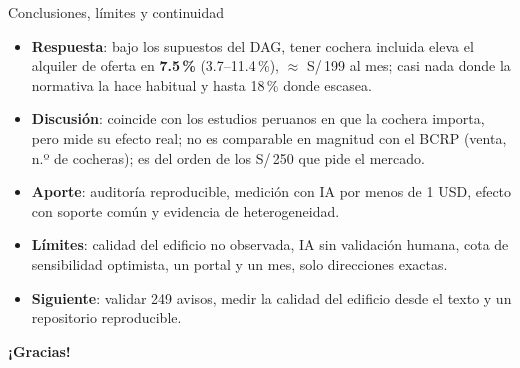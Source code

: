 \documentclass[aspectratio=169,11pt]{beamer}
\begin{document}
\begin{frame}{Conclusiones, límites y continuidad}
\small
\begin{itemize}
\item \textbf{Respuesta}: bajo los supuestos del DAG, tener cochera incluida eleva el alquiler de oferta en \textbf{7.5\,\%} (3.7--11.4\,\%), $\approx$ S/\,199 al mes; casi nada donde la normativa la hace habitual y hasta 18\,\% donde escasea.
\item \textbf{Discusión}: coincide con los estudios peruanos en que la cochera importa, pero mide su efecto real; no es comparable en magnitud con el BCRP (venta, n.º de cocheras); es del orden de los S/\,250 que pide el mercado.
\item \textbf{Aporte}: auditoría reproducible, medición con IA por menos de 1 USD, efecto con soporte común y evidencia de heterogeneidad.
\item \textbf{Límites}: calidad del edificio no observada, IA sin validación humana, cota de sensibilidad optimista, un portal y un mes, solo direcciones exactas.
\item \textbf{Siguiente}: validar 249 avisos, medir la calidad del edificio desde el texto y un repositorio reproducible.
\end{itemize}
\vspace{0.2cm}
\begin{center}\Large\color{azul}\textbf{¡Gracias!}\end{center}
\end{frame}
\end{document}
